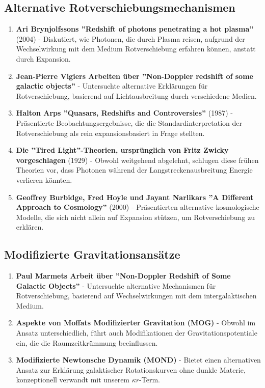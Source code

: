 \documentclass[12pt,a4paper]{article}
\begin{document}
	\subsection{Alternative Rotverschiebungsmechanismen}
	\label{subsec:alternative_redshift}
	
	\begin{enumerate}
		\item \textbf{Ari Brynjolfssons ''Redshift of photons penetrating a hot plasma''}\cite{brynjolfsson2004} (2004) - Diskutiert, wie Photonen, die durch Plasma reisen, aufgrund der Wechselwirkung mit dem Medium Rotverschiebung erfahren können, anstatt durch Expansion.
		
		\item \textbf{Jean-Pierre Vigiers Arbeiten über ''Non-Doppler redshift of some galactic objects''}\cite{vigier1990} - Untersuchte alternative Erklärungen für Rotverschiebung, basierend auf Lichtausbreitung durch verschiedene Medien.
		
		\item \textbf{Halton Arps ''Quasars, Redshifts and Controversies''}\cite{arp1987} (1987) - Präsentierte Beobachtungsergebnisse, die die Standardinterpretation der Rotverschiebung als rein expansionsbasiert in Frage stellten.
		
		\item \textbf{Die ''Tired Light''-Theorien, ursprünglich von Fritz Zwicky vorgeschlagen}\cite{zwicky1929} (1929) - Obwohl weitgehend abgelehnt, schlugen diese frühen Theorien vor, dass Photonen während der Langstreckenausbreitung Energie verlieren könnten.
		
		\item \textbf{Geoffrey Burbidge, Fred Hoyle und Jayant Narlikars ''A Different Approach to Cosmology''}\cite{burbidge2000} (2000) - Präsentierten alternative kosmologische Modelle, die sich nicht allein auf Expansion stützen, um Rotverschiebung zu erklären.
	\end{enumerate}
	
	\subsection{Modifizierte Gravitationsansätze}
	\label{subsec:modified_gravity_lit}
	
	\begin{enumerate}
		\item \textbf{Paul Marmets Arbeit über ''Non-Doppler Redshift of Some Galactic Objects''}\cite{marmet1988} - Untersuchte alternative Mechanismen für Rotverschiebung, basierend auf Wechselwirkungen mit dem intergalaktischen Medium.
		
		\item \textbf{Aspekte von Moffats Modifizierter Gravitation (MOG)}\cite{moffat2006} - Obwohl im Ansatz unterschiedlich, führt auch Modifikationen der Gravitationspotentiale ein, die die Raumzeitkrümmung beeinflussen.
		
		\item \textbf{Modifizierte Newtonsche Dynamik (MOND)}\cite{milgrom1983} - Bietet einen alternativen Ansatz zur Erklärung galaktischer Rotationskurven ohne dunkle Materie, konzeptionell verwandt mit unserem $\kappa r$-Term.
	\end{enumerate}
	
\end{document}

